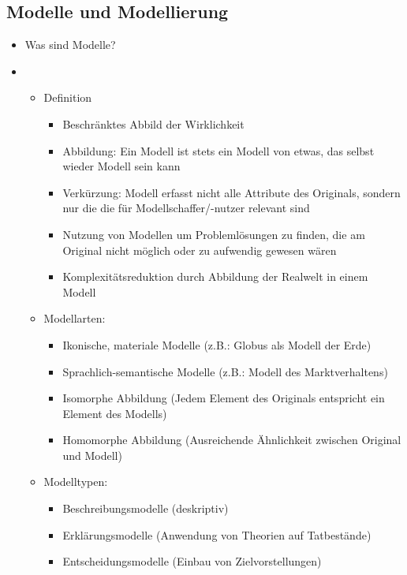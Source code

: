 \subsection{Modelle und Modellierung}
\begin{itemize}


\item Was sind Modelle?
\item[] 
	\begin{itemize}
	
	\item Definition
		\begin{itemize}
		\item Beschränktes Abbild der Wirklichkeit
		\item Abbildung: Ein Modell ist stets ein Modell von etwas, das selbst wieder Modell sein kann
		\item Verkürzung: Modell erfasst nicht alle Attribute des Originals, sondern nur die die für Modellschaffer/-nutzer relevant sind
		\item Nutzung von Modellen um Problemlösungen zu finden, die am Original nicht möglich oder zu aufwendig gewesen wären
		\item Komplexitätsreduktion durch Abbildung der Realwelt in einem Modell
		\end{itemize}

	\item Modellarten:
		\begin{itemize}
		\item Ikonische, materiale Modelle (z.B.: Globus als Modell der Erde)
		\item Sprachlich-semantische Modelle (z.B.: Modell des Marktverhaltens)
		\item Isomorphe Abbildung (Jedem Element des Originals entspricht ein Element des Modells)
		\item Homomorphe Abbildung (Ausreichende Ähnlichkeit zwischen Original und Modell)
		\end{itemize}

	\item Modelltypen:
		\begin{itemize}
		\item Beschreibungsmodelle (deskriptiv)
		\item Erklärungsmodelle (Anwendung von Theorien auf Tatbestände)
		\item Entscheidungsmodelle (Einbau von Zielvorstellungen)
		\end{itemize}			
	
	\end{itemize}


\end{itemize}

